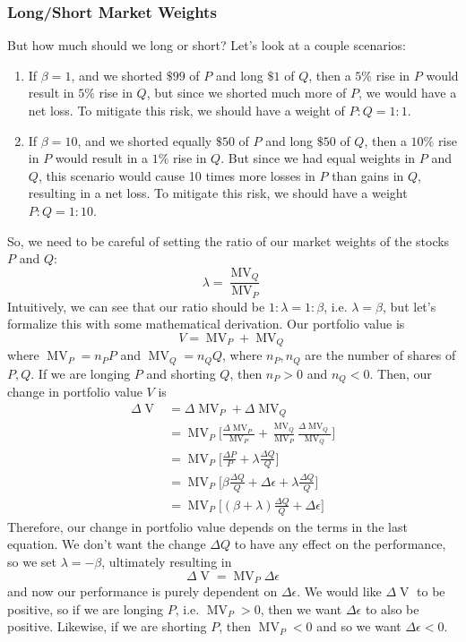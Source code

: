 \documentclass{article}
\DeclareMathOperator{\MV}{MV}
\DeclareMathOperator{\V}{V}
\begin{document}
\subsubsection{Long/Short Market Weights}
But how much should we long or short? Let's look at a couple scenarios: 
\begin{enumerate}
    \item If $\beta = 1$, and we shorted $\$99$ of $P$ and long $\$1$ of $Q$, then a $5\%$ rise in $P$ would result in $5\%$ rise in $Q$, but since we shorted much more of $P$, we would have a net loss. To mitigate this risk, we should have a weight of $P:Q = 1:1$. 
    \item If $\beta = 10$, and we shorted equally $\$50$ of $P$ and long $\$50$ of $Q$, then a $10\%$ rise in $P$ would result in a $1\%$ rise in $Q$. But since we had equal weights in $P$ and $Q$, this scenario would cause 10 times more losses in $P$ than gains in $Q$, resulting in a net loss. To mitigate this risk, we should have a weight $P:Q = 1:10$. 
\end{enumerate}
So, we need to be careful of setting the ratio of our market weights of the stocks $P$ and $Q$: 
\[\lambda = \frac{\MV_Q}{\MV_P}\]
Intuitively, we can see that our ratio should be $1: \lambda = 1:\beta$, i.e. $\lambda = \beta$, but let's formalize this with some mathematical derivation. Our portfolio value is 
\[V = \MV_P + \MV_Q\]
where $\MV_P = n_P P$ and $\MV_Q = n_Q Q$, where $n_P, n_Q$ are the number of shares of $P, Q$. If we are longing $P$ and shorting $Q$, then $n_P > 0$ and $n_Q < 0$. Then, our change in portfolio value $V$ is 
\begin{align*}
    \Delta \V & = \Delta \MV_P + \Delta \MV_Q \\
    & = \MV_P \bigg[\frac{\Delta \MV_P}{\MV_P} + \frac{\MV_Q}{\MV_P} \frac{\Delta \MV_Q}{\MV_Q}  \bigg] \\
    & = \MV_P \bigg[ \frac{\Delta P}{P} + \lambda \frac{\Delta Q}{Q} \bigg] \\
    & = \MV_P \bigg[ \beta \frac{\Delta Q}{Q} + \Delta \epsilon + \lambda \frac{\Delta Q}{Q} \bigg] \\
    & = \MV_P \bigg[ (\beta + \lambda) \frac{\Delta Q}{Q} + \Delta \epsilon \bigg] 
\end{align*}
Therefore, our change in portfolio value depends on the terms in the last equation. We don't want the change $\Delta Q$ to have any effect on the performance, so we set $\lambda = - \beta$, ultimately resulting in 
\[\Delta \V = \MV_P \Delta \epsilon\]
and now our performance is purely dependent on $\Delta \epsilon$. We would like $\Delta \V$ to be positive, so if we are longing $P$, i.e. $\MV_P > 0$, then we want $\Delta \epsilon$ to also be positive. Likewise, if we are shorting $P$, then $\MV_P < 0$ and so we want $\Delta \epsilon < 0$. 
\end{document}
